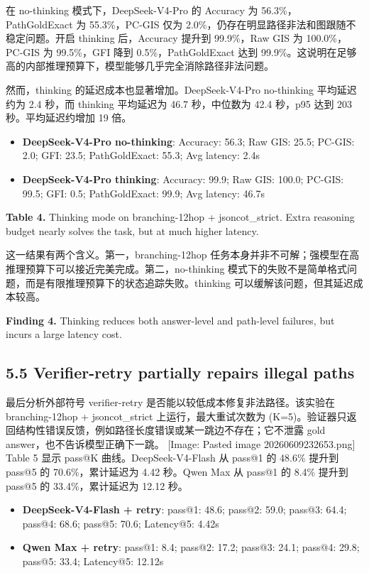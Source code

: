 \documentclass[
  11pt,
]{article}
\providecommand{\tightlist}{%
  \setlength{\itemsep}{0pt}\setlength{\parskip}{0pt}}
\begin{document}
在 no-thinking 模式下，DeepSeek-V4-Pro 的 Accuracy 为
56.3\%，PathGoldExact 为 55.3\%，PC-GIS 仅为
2.0\%，仍存在明显路径非法和图跟随不稳定问题。开启 thinking 后，Accuracy
提升到 99.9\%，Raw GIS 为 100.0\%，PC-GIS 为 99.5\%，GFI 降到
0.5\%，PathGoldExact 达到
99.9\%。这说明在足够高的内部推理预算下，模型能够几乎完全消除路径非法问题。

然而，thinking 的延迟成本也显著增加。DeepSeek-V4-Pro no-thinking
平均延迟约为 2.4 秒，而 thinking 平均延迟为 46.7 秒，中位数为 42.4
秒，p95 达到 203 秒。平均延迟约增加 19 倍。

\begin{itemize}
\tightlist
\item
  \textbf{DeepSeek-V4-Pro no-thinking}: Accuracy: 56.3; Raw GIS: 25.5;
  PC-GIS: 2.0; GFI: 23.5; PathGoldExact: 55.3; Avg latency: 2.4s
\item
  \textbf{DeepSeek-V4-Pro thinking}: Accuracy: 99.9; Raw GIS: 100.0;
  PC-GIS: 99.5; GFI: 0.5; PathGoldExact: 99.9; Avg latency: 46.7s
\end{itemize}

\textbf{Table 4.} Thinking mode on branching-12hop + jsoncot\_strict.
Extra reasoning budget nearly solves the task, but at much higher
latency.

这一结果有两个含义。第一，branching-12hop
任务本身并非不可解；强模型在高推理预算下可以接近完美完成。第二，no-thinking
模式下的失败不是简单格式问题，而是有限推理预算下的状态追踪失败。thinking
可以缓解该问题，但其延迟成本较高。

\textbf{Finding 4.} Thinking reduces both answer-level and path-level
failures, but incurs a large latency cost.

\subsection{5.5 Verifier-retry partially repairs illegal
paths}\label{verifier-retry-partially-repairs-illegal-paths}

最后分析外部符号 verifier-retry 是否能以较低成本修复非法路径。该实验在
branching-12hop + jsoncot\_strict 上运行，最大重试次数为
(K=5)。验证器只返回结构性错误反馈，例如路径长度错误或某一跳边不存在；它不泄露
gold answer，也不告诉模型正确下一跳。 {[}Image: Pasted image
20260609232653.png{]} Table 5 显示 pass@K 曲线。DeepSeek-V4-Flash 从
pass@1 的 48.6\% 提升到 pass@5 的 70.6\%，累计延迟为 4.42 秒。Qwen Max
从 pass@1 的 8.4\% 提升到 pass@5 的 33.4\%，累计延迟为 12.12 秒。

\begin{itemize}
\tightlist
\item
  \textbf{DeepSeek-V4-Flash + retry}: pass@1: 48.6; pass@2: 59.0;
  pass@3: 64.4; pass@4: 68.6; pass@5: 70.6; Latency@5: 4.42s
\item
  \textbf{Qwen Max + retry}: pass@1: 8.4; pass@2: 17.2; pass@3: 24.1;
  pass@4: 29.8; pass@5: 33.4; Latency@5: 12.12s
\end{itemize}
\end{document}

